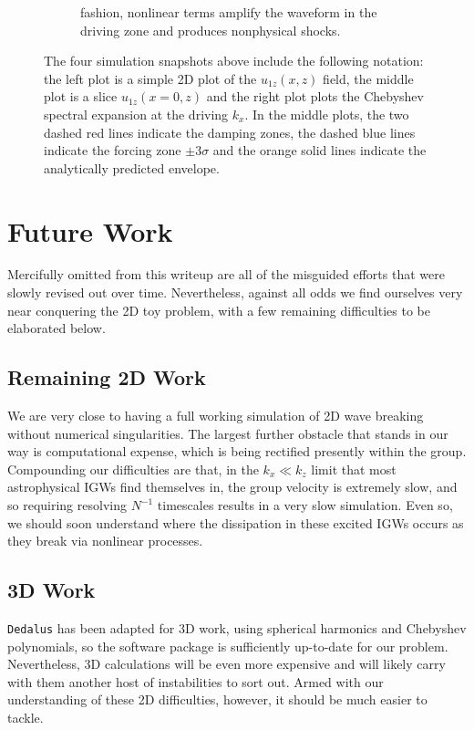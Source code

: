 \documentclass[11pt,
        usenames, %
        dvipsnames %
    ]{article}
\begin{document}
\begin{figure}[t]
\begin{subfigure}{0.47\textwidth}
{        fashion, nonlinear terms amplify the waveform in the driving zone and
        produces nonphysical shocks.}\label{fig:blowup}
    \end{subfigure}
    \caption{The four simulation snapshots above include the following notation:
        the left plot is a simple 2D plot of the $u_{1z}(x, z)$ field, the
        middle plot is a slice $u_{1z}(x=0, z)$ and the right plot plots the
        Chebyshev spectral expansion at the driving $k_x$. In the middle plots,
        the two dashed red lines indicate the damping zones, the dashed blue
        lines indicate the forcing zone $\pm 3\sigma$ and the orange solid lines
        indicate the analytically predicted envelope.}\label{fig:plots}
\end{figure}

\section{Future Work}

Mercifully omitted from this writeup are all of the misguided efforts that were
slowly revised out over time. Nevertheless, against all odds we find ourselves
very near conquering the 2D toy problem, with a few remaining difficulties to be
elaborated below.

\subsection{Remaining 2D Work}

We are very close to having a full working simulation of 2D wave breaking
without numerical singularities. The largest further obstacle that stands in our
way is computational expense, which is being rectified presently within the
group. Compounding our difficulties are that, in the $k_x \ll k_z$ limit that
most astrophysical IGWs find themselves in, the group velocity is extremely
slow, and so requiring resolving $N^{-1}$ timescales results in a very slow
simulation. Even so, we should soon understand where the dissipation in these
excited IGWs occurs as they break via nonlinear processes.

\subsection{3D Work}

\lstinline{Dedalus} has been adapted for 3D work, using spherical harmonics and
Chebyshev polynomials, so the software package is sufficiently up-to-date for
our problem. Nevertheless, 3D calculations will be even more expensive and will
likely carry with them another host of instabilities to sort out. Armed with our
understanding of these 2D difficulties, however, it should be much easier to
tackle.
\end{document}
